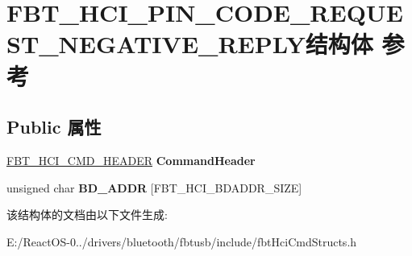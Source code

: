 \hypertarget{struct_f_b_t___h_c_i___p_i_n___c_o_d_e___r_e_q_u_e_s_t___n_e_g_a_t_i_v_e___r_e_p_l_y}{}\section{F\+B\+T\+\_\+\+H\+C\+I\+\_\+\+P\+I\+N\+\_\+\+C\+O\+D\+E\+\_\+\+R\+E\+Q\+U\+E\+S\+T\+\_\+\+N\+E\+G\+A\+T\+I\+V\+E\+\_\+\+R\+E\+P\+L\+Y结构体 参考}
\label{struct_f_b_t___h_c_i___p_i_n___c_o_d_e___r_e_q_u_e_s_t___n_e_g_a_t_i_v_e___r_e_p_l_y}
\subsection*{Public 属性}
\begin{DoxyCompactItemize}
\item 
\mbox{\label{struct_f_b_t___h_c_i___p_i_n___c_o_d_e___r_e_q_u_e_s_t___n_e_g_a_t_i_v_e___r_e_p_l_y_afa3898211d7772c5a1457d850ecd6616}} 
\hyperlink{struct_f_b_t___h_c_i___c_m_d___h_e_a_d_e_r}{F\+B\+T\+\_\+\+H\+C\+I\+\_\+\+C\+M\+D\+\_\+\+H\+E\+A\+D\+ER} {\bfseries Command\+Header}
\item 
\mbox{\label{struct_f_b_t___h_c_i___p_i_n___c_o_d_e___r_e_q_u_e_s_t___n_e_g_a_t_i_v_e___r_e_p_l_y_ac8b72bbfd726930366e3e0a609d74a0a}} 
unsigned char {\bfseries B\+D\+\_\+\+A\+D\+DR} \mbox{[}F\+B\+T\+\_\+\+H\+C\+I\+\_\+\+B\+D\+A\+D\+D\+R\+\_\+\+S\+I\+ZE\mbox{]}
\end{DoxyCompactItemize}


该结构体的文档由以下文件生成\+:\begin{DoxyCompactItemize}
\item 
E\+:/\+React\+O\+S-\/0../drivers/bluetooth/fbtusb/include/fbt\+Hci\+Cmd\+Structs.\+h\end{DoxyCompactItemize}

